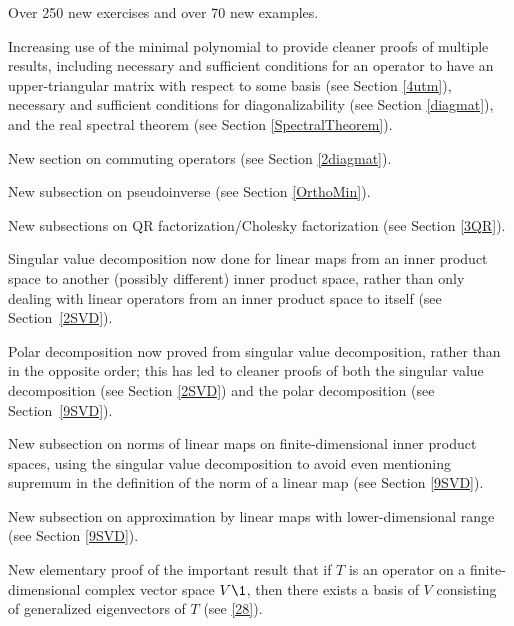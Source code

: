 \begin{Itemize}

\item
Over 250 new exercises and over 70 new examples.

\item
Increasing use of the minimal polynomial to provide cleaner proofs of multiple results, including necessary and sufficient conditions for an operator to have an upper-triangular matrix with respect to some basis (see Section \ref{4utm}), necessary and sufficient conditions for diagonalizability (see Section \ref{diagmat}), and the real spectral theorem (see Section \ref{SpectralTheorem}).

\item
New section on commuting operators (see Section \ref{2diagmat}).

\item
New subsection on pseudoinverse (see Section \ref{OrthoMin}).

\item
New subsections on QR factorization/Cholesky factorization (see Section \ref{3QR}).

\item
Singular value decomposition now done for linear maps from an inner product space to another (possibly different) inner product space, rather than only dealing with linear operators from an inner product space to itself (see Section~\ref{2SVD}).

\item
Polar decomposition now proved from singular value decomposition, rather than in the opposite order; this has led to cleaner proofs of both the singular value decomposition (see Section \ref{2SVD}) and the polar decomposition (see Section~\ref{9SVD}).

\item
New subsection on norms of linear maps on finite-dimensional inner product spaces, using the singular value decomposition to avoid even mentioning supremum in the definition of the norm of a linear map (see Section \ref{9SVD}).

\item
New subsection on approximation by linear maps with lower-dimensional range (see Section \ref{9SVD}).

\item
New elementary proof of the important result that if $T$ is an operator on a finite-dimensional complex vector space $V\1$, then there exists a basis of $V$ consisting of generalized eigenvectors of $T$ (see \ref{28}).


\end{Itemize}
